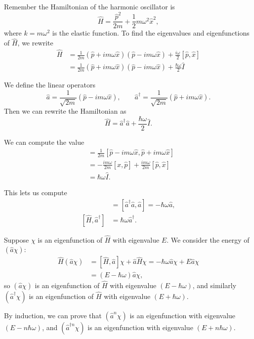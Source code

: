 \documentclass[12pt]{article}
\begin{document}
Remember the Hamiltonian of the harmonic oscillator is
\[
\hat H = \frac{\hat p^2}{2m} + \frac{1}{2} m \omega^2 \hat x^2
,\]
where $k = m \omega^2$ is the elastic function. To find the eigenvalues and eigenfunctions of $\hat H$, we rewrite
\begin{align*}
	\hat H &= \frac{1}{2m} (\hat p + i m \omega \hat x)(\hat p - i m \omega \hat x) + \frac{i \omega}{2} [\hat p, \hat x] \\
	&= \frac{1}{2m}(\hat p + i m \omega \hat x)(\hat p - i m \omega \hat x) + \frac{\hbar \omega}{2} \hat I
\end{align*}

\begin{definition}
	We define the linear operators
	\[
		\hat a = \frac{1}{\sqrt{2m}}(\hat p - i m \omega \hat x), \qquad \hat a^{\dagger} = \frac{1}{\sqrt{2m}} (\hat p + i m \omega \hat x)
	.\]
	Then we can rewrite the Hamiltonian as
	\[
	\hat H = \hat a^{\dagger}\hat a + \frac{\hbar \omega}{2} \hat I
	.\]
\end{definition}

We can compute the value
\begin{align*}
	[\hat a, \hat a^{\dagger}] &= \frac{1}{2m} [\hat p - i m \omega \hat x, \hat p + i m \omega \hat x] \\
				   &= - \frac{i m \omega}{2m} [\hat x, \hat p] + \frac{i m \omega}{2m}[\hat p, \hat x] \\
				   &= \hbar \omega \hat I.
\end{align*}

This lets us compute
\begin{align*}
	[\hat H, \hat a] &= [\hat a^{\dagger} \hat a, \hat a] = - \hbar \omega \hat a, \\
	[\hat H, \hat a^{\dagger}] &= \hbar \omega \hat a^{\dagger}.
\end{align*}

Suppose $\chi$ is an eigenfunction of $\hat H$ with eigenvalue $E$. We consider the energy of $(\hat a \chi)$:
\begin{align*}
	\hat H(\hat a \chi) &= [\hat H, \hat a]\chi + \hat a \hat H \chi = - \hbar \omega \hat a \chi + E \hat a \chi \\
			    &= (E - \hbar \omega)\hat a \chi,
\end{align*}
so $(\hat a \chi)$ is an eigenfunction of $\hat H$ with eigenvalue $(E - \hbar \omega)$, and similarly $(\hat a^{\dagger} \chi)$ is an eigenfunction of $\hat H$ with eigenvalue $(E + \hbar \omega)$.

By induction, we can prove that $(\hat a^{n} \chi)$ is an eigenfunction with eigenvalue $(E - n \hbar \omega)$, and $( \hat{a}^{\dagger n} \chi)$ is an eigenfunction with eigenvalue $(E + n \hbar \omega)$.
\end{document}
